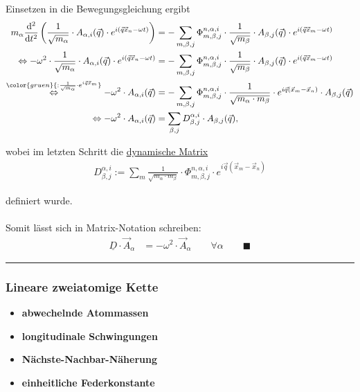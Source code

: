 \documentclass{article}
\newcommand{\diff}{\mathrm{d}}
\newcommand{\lr}[1]{\left(#1\right)}
\newcommand{\comment}[1]{{\color{gruen}{#1}}}
\begin{document}
{	Einsetzen in die Bewegungsgleichung ergibt
	\begin{align*}
		m_\alpha \frac{\diff^2}{\diff t^2} \lr{ \frac{1}{\sqrt{m_\alpha}} \cdot A_{\alpha,i}(\vec{q}) \cdot e^{i(\vec{q}\vec{x}_n - \omega t)} } &= -\sum_{m,\beta,j} \Phi_{m,\beta,j}^{n,\alpha,i} \cdot \frac{1}{\sqrt{m_\beta}} \cdot A_{\beta,j}(\vec{q}) \cdot e^{i(\vec{q}\vec{x}_m - \omega t)} \\
		\Leftrightarrow -\omega^2 \cdot \frac{1}{\sqrt{m_\alpha}} \cdot A_{\alpha,i}(\vec{q}) \cdot e^{i(\vec{q}\vec{x}_n - \omega t)} &= -\sum_{m,\beta,j} \Phi_{m,\beta,j}^{n,\alpha,i} \cdot \frac{1}{\sqrt{m_\beta}} \cdot A_{\beta,j}(\vec{q}) \cdot e^{i(\vec{q}\vec{x}_m - \omega t)} \\
		\stackrel{\comment{:\frac{1}{\sqrt{m_\alpha}} \cdot e^{i\vec{q}\vec{x}_m}}}{\Leftrightarrow} -\omega^2 \cdot A_{\alpha,i}(\vec{q}) &= -\sum_{m,\beta,j} \Phi_{m,\beta,j}^{n,\alpha,i} \cdot \frac{1}{\sqrt{m_\alpha \cdot m_\beta}} \cdot e^{i\vec{q}(\vec{x}_m - \vec{x}_n)} \cdot A_{\beta,j}(\vec{q}) \\
		\Leftrightarrow -\omega^2 \cdot A_{\alpha,i}(\vec{q}) &= \sum_{\beta,j} D_{\beta,j}^{\alpha,i} \cdot A_{\beta,j}(\vec{q}),
	\end{align*}

	wobei im letzten Schritt die \underline{dynamische Matrix}
		\begin{align*}
			D_{\beta,j}^{\alpha,i} := \sum_m \frac{1}{\sqrt{m_\alpha \cdot m_\beta}} \cdot \Phi_{m,\beta,j}^{n,\alpha,i} \cdot e^{i\vec{q}(\vec{x}_m-\vec{x}_n)}
		\end{align*}
	
	definiert wurde.\\
	\\
	Somit lässt sich in Matrix-Notation schreiben:
		\begin{align*}
			\underline{D} \cdot \vec{A}_\alpha &= -\omega^2 \cdot \vec{A}_\alpha \qquad \forall\alpha \qquad \blacksquare
		\end{align*}

\hrule
}


\newpage


\subsubsection{Lineare zweiatomige Kette}
	\begin{itemize}
		\item \textbf{abwechelnde Atommassen}
		
		
		\item \textbf{longitudinale Schwingungen}
		
		
		\item \textbf{Nächste-Nachbar-Näherung}
		
		
		\item \textbf{einheitliche Federkonstante}
	\end{itemize}
\end{document}
